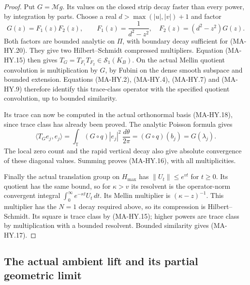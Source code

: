 \begin{proof}
Put $G=\mathcal Mg$.  Its values on the closed strip
decay faster than every power, by integration by parts.
Choose a real $d>\max(|u|,|v|)+1$ and factor
\[
       G(z)=F_1(z)F_2(z),\qquad
       F_1(z)=\frac1{d^2-z^2},\quad
       F_2(z)=(d^2-z^2)G(z).
 \tag{MA-HY.21}
\]
Both factors are bounded analytic on $\Pi$, with
boundary decay sufficient for (MA-HY.20).
They give two Hilbert--Schmidt compressed multipliers.
Equation (MA-HY.15) then gives
$T_G=T_{F_1}T_{F_2}\in\mathcal S_1(K_B)$.
On the actual Mellin quotient convolution is
multiplication by $G$, by Fubini on the dense smooth
subspace and bounded extension.  Equations (MA-HY.2),
(MA-HY.4), (MA-HY.7) and (MA-HY.9) therefore identify
this trace-class operator with the specified quotient
convolution, up to bounded similarity.

Its trace can now be computed in the actual orthonormal
basis (MA-HY.18), since trace class has already been proved.
The analytic Poisson formula gives
\[
 \langle T_Ge_j,e_j\rangle
      =\int_{\mathbb T}(G\circ q)|e_j|^2\,\frac{d\theta}{2\pi}
      =(G\circ q)(b_j)=G(\lambda_j).
 \tag{MA-HY.22}
\]
The local zero count and the rapid vertical decay also
give absolute convergence of these diagonal values.
Summing proves (MA-HY.16), with all multiplicities.

Finally the actual translation group on $H_{\max}$ has
$\|U_t\|\le e^{vt}$ for $t\ge0$.  Its quotient has the same
bound, so for $\kappa>v$ its resolvent is the operator-norm
convergent integral
$\int_0^\infty e^{-\kappa t}U_t\,dt$.
Its Mellin multiplier is $(\kappa-z)^{-1}$.
This multiplier has the $N=1$ decay required above,
so its compression is Hilbert--Schmidt.
Its square is trace class by (MA-HY.15); higher powers
are trace class by multiplication with a bounded
resolvent.  Bounded similarity gives (MA-HY.17).
\end{proof}

\subsection{The actual ambient lift and its partial geometric limit}

